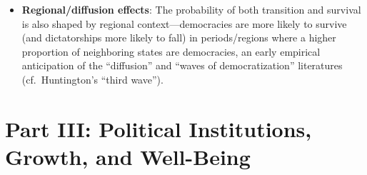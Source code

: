 \documentclass[12pt]{article}
\begin{document}
\begin{itemize}[leftmargin=*, itemsep=4pt]
    \item \textbf{Regional/diffusion effects}: The probability of both transition and survival is also shaped by regional context---democracies are more likely to survive (and dictatorships more likely to fall) in periods/regions where a higher proportion of neighboring states are democracies, an early empirical anticipation of the ``diffusion'' and ``waves of democratization'' literatures (cf.\ Huntington's ``third wave'').
\end{itemize}

\section{Part III: Political Institutions, Growth, and Well-Being}
\end{document}

